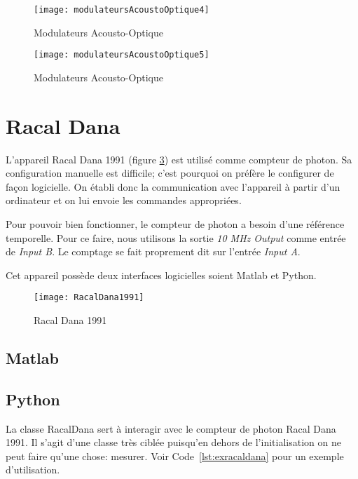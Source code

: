 \documentclass[11pt,francais]{book} %
\begin{document}
\begin{figure}[htbp]
  \centering\texttt{[image: modulateursAcoustoOptique4]}
  \caption{Modulateurs Acousto-Optique}
  \label{fig:modulateursAcoustoOptique4}
\end{figure}

\begin{figure}[htbp]
  \centering\texttt{[image: modulateursAcoustoOptique5]}
  \caption{Modulateurs Acousto-Optique}
  \label{fig:modulateursAcoustoOptique5}
\end{figure}



\section{Racal Dana}

L'appareil Racal Dana 1991 (figure \ref{fig:racaldana}) est utilisé comme compteur de photon.
Sa configuration manuelle est difficile; c'est pourquoi on préfère le configurer de fa\c{c}on logicielle.
On établi donc la communication avec l'appareil à partir d'un ordinateur et on lui envoie les commandes appropriées.

Pour pouvoir bien fonctionner, le compteur de photon a besoin d'une référence temporelle.
Pour ce faire, nous utilisons la sortie {\it 10 MHz Output} comme entrée de {\it Input B}.
Le comptage se fait proprement dit sur l'entrée {\it Input A}.

Cet appareil possède deux interfaces logicielles soient Matlab et Python.

\begin{figure}[htbp]
\centering\texttt{[image: RacalDana1991]}
\caption{Racal Dana 1991}
\label{fig:racaldana}
\end{figure}

\subsection{Matlab}

\subsection{Python}

La classe RacalDana sert à interagir avec le compteur de photon Racal Dana 1991.
Il s'agit d'une classe très ciblée puisqu'en dehors de l'initialisation on ne peut faire qu'une chose: mesurer.
Voir Code~\ref{lst:exracaldana} pour un exemple d'utilisation.
\end{document}
